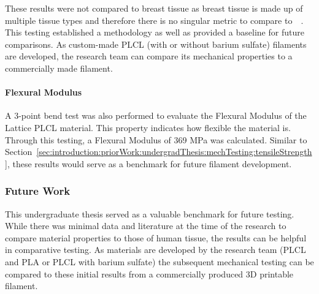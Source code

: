 These results were not compared to breast tissue as breast tissue is made up of multiple tissue types and therefore there is no singular metric to compare to~\cite{RefWorks:RefID:36-american2021breast}~\cite{RefWorks:RefID:370-einsteinisaac}. This testing established a methodology as well as provided a baseline for future comparisons. As custom-made PLCL (with or without barium sulfate) filaments are developed, the research team can compare its mechanical properties to a commercially made filament.

\paragraph*{Flexural Modulus\label{sec:introduction:priorWork:undergradThesis:mechTesting:flexuralModulus}}

A 3-point bend test was also performed to evaluate the Flexural Modulus of the Lattice PLCL material. This property indicates how flexible the material is. Through this testing, a Flexural Modulus of 369 MPa was calculated. Similar to Section~\ref{sec:introduction:priorWork:undergradThesis:mechTesting:tensileStrength}, these results would serve as a benchmark for future filament development.

\subsubsection{Future Work\label{sec:introduction:priorWork:undergradThesis:futureWork}}

This undergraduate thesis served as a valuable benchmark for future testing. While there was minimal data and literature at the time of the research to compare material properties to those of human tissue, the results can be helpful in comparative testing. As materials are developed by the research team (PLCL and PLA or PLCL with barium sulfate) the subsequent mechanical testing can be compared to these initial results from a commercially produced 3D printable filament.
